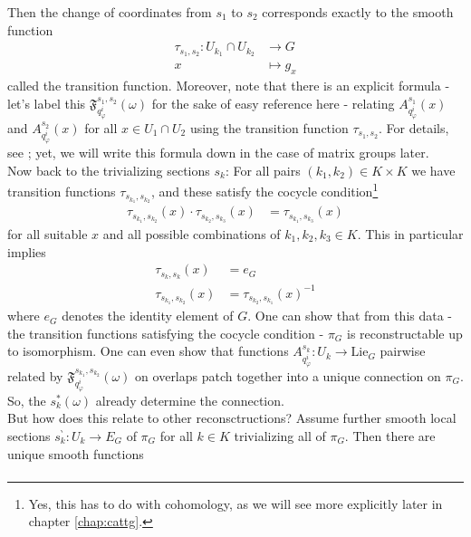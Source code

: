 \begin{enumerate}
Then the change of coordinates from $s_{1}$ to $s_{2}$ corresponds exactly to the smooth function
\begin{align*}
  \tau_{s_{1},s_{2}}
  \colon
  U_{k_{1}}
  \cap
  U_{k_{2}}
  &\rightarrow
  G
  \\
  x
  &\mapsto
  g_{x}
\end{align*}
called the transition function.
Moreover, note that there is an explicit formula - let's label this $\mathfrak{F}_{q_{\varphi}^{i}}^{s_{1},s_{2}}(\omega)$ for the sake of easy reference here - relating $A_{q_{\varphi}^{i}}^{s_{1}}(x)$ and $A_{q_{\varphi}^{i}}^{s_{2}}(x)$ for all $x \in U_{1} \cap U_{2}$ using the transition function $\tau_{s_{1},s_{2}}$.
For details, see \cite{797789bc}; yet, we will write this formula down in the case of matrix groups later.
\\
Now back to the trivializing sections $s_{k}$: For all pairs $(k_{1},k_{2}) \in K \times K$ we have transition functions $\tau_{s_{k_{1}},s_{k_{2}}}$, and these satisfy the cocycle condition\footnote{Yes, this has to do with cohomology, as we will see more explicitly later in chapter \ref{chap:cattg}.}
\begin{align*}
  \tau_{s_{k_{1}},s_{k_{2}}}(x)
  \cdot
  \tau_{s_{k_{2}},s_{k_{3}}}(x)
  &=
  \tau_{s_{k_{1}},s_{k_{3}}}(x)
\end{align*}
for all suitable $x$ and all possible combinations of $k_{1},k_{2},k_{3} \in K$.
This in particular implies
\begin{align*}
  \tau_{s_{k},s_{k}}(x)
  &=
  e_{G}
  \\
  \tau_{s_{k_{1}},s_{k_{2}}}(x) 
  &=
  \tau_{s_{k_{2}},s_{k_{1}}}(x)^{-1}
\end{align*}
where $e_{G}$ denotes the identity element of $G$.
One can show that from this data - the transition functions satisfying the cocycle condition - $\pi_{G}$ is reconstructable up to isomorphism.
One can even show that functions $A_{q_{\varphi}^{i}}^{s_{k}} \colon U_{k} \rightarrow \mathrm{Lie}_{G}$ pairwise related by $\mathfrak{F}_{q_{\varphi}^{i}}^{s_{k_{1}},s_{k_{2}}}(\omega)$ on overlaps patch together into a unique connection on $\pi_{G}$.
So, the $s_{k}^{\ast}(\omega)$ already determine the connection.
\\
But how does this relate to other reconsctructions?
Assume further smooth local sections $s_{k}^{\backprime} \colon U_{k} \rightarrow E_{G}$ of $\pi_{G}$ for all $k \in K$ trivializing all of $\pi_{G}$.
Then there are unique smooth functions
\begin{align*}

\end{align*}
\end{enumerate}
